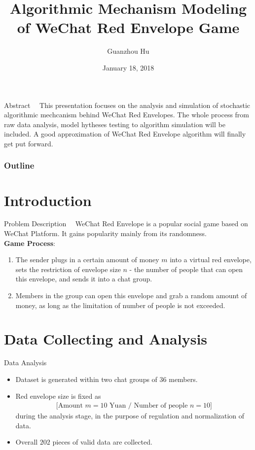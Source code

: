 \documentclass[12pt]{beamer}
\title[WeChat Red Envelope Modeling]{Algorithmic Mechanism Modeling of WeChat Red Envelope Game}
\author{Guanzhou Hu}
\institute[ShanghaiTech]{School of Information Science and Technology \\ShanghaiTech University}
\date{January 18, 2018}
\renewcommand{\[}{\begin{equation*} \begin{aligned}} %
\renewcommand{\]}{\end{aligned} \end{equation*}}
\begin{document}
\begin{frame}
	\titlepage
\end{frame}

\begin{frame}{Abstract}
	\ \ This presentation focuses on the analysis and simulation of stochastic algorithmic mechcanism behind WeChat Red Envelopes. The whole process from raw data analysis, model hytheses testing to algorithm simulation will be included. A good approximation of WeChat Red Envelope algorithm will finally get put forward.
\end{frame}

\begin{frame}
  \frametitle{Outline}
  \tableofcontents
\end{frame}


\section{Introduction}

\begin{frame}{Problem Description}
	\ \ WeChat Red Envelope is a popular social game based on WeChat Platform. It gains popularity mainly from its randomness. \\[6pt]
	\textbf{Game Process}: \begin{enumerate}
		\item The sender plugs in a certain amount of money $m$ into a virtual red envelope, sets the restriction of envelope size $n$ - the number of people that can open this envelope, and sends it into a chat group.
		\item Members in the group can open this envelope and grab a random amount of money, as long as the limitation of number of people is not exceeded.
	\end{enumerate}
\end{frame}

\section{Data Collecting and Analysis}

\begin{frame}{Data Analysis}
	\begin{itemize}
		\item Dataset is generated within two chat groups of $36$ members.
		\item Red envelope size is fixed as 
			\[
				\text{[Amount $m = 10$ Yuan / Number of people $n = 10$]}
			\]
			during the analysis stage, in the purpose of regulation and normalization of data.
		\item Overall $202$ pieces of valid data are collected.
	\end{itemize}
\end{frame}
\end{document}
